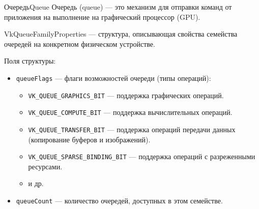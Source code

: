 \documentclass{beamer}
\begin{document}
	\begin{frame}{Очередь}{Queue}
		Очередь (queue) — это механизм для отправки команд от приложения на выполнение на графический процессор (GPU). 

		VkQueueFamilyProperties --- структура, описывающая свойства семейства очередей на конкретном физическом устройстве.

		Поля структуры:
		\begin{itemize}
				\item \texttt{queueFlags} --- флаги возможностей очереди (типы операций):
				\begin{itemize}
						\item \texttt{VK\_QUEUE\_GRAPHICS\_BIT} --- поддержка графических операций.
						\item \texttt{VK\_QUEUE\_COMPUTE\_BIT} --- поддержка вычислительных операций.
						\item \texttt{VK\_QUEUE\_TRANSFER\_BIT} --- поддержка операций передачи данных (копирование буферов и изображений).
						\item \texttt{VK\_QUEUE\_SPARSE\_BINDING\_BIT} --- поддержка операций с разреженными ресурсами.
						\item и др.
				\end{itemize}
				
				\item \texttt{queueCount} --- количество очередей, доступных в этом семействе.
		\end{itemize}

			
		\end{frame}
	
\end{document}
